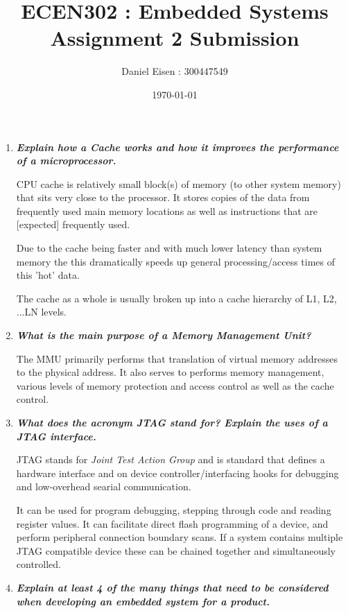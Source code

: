 \documentclass[11pt]{article}
\title{ECEN302 : Embedded Systems \\ Assignment 2 Submission}
\author{Daniel Eisen : 300447549}
\date{\today}
\begin{document}
\maketitle
\begin{enumerate}
    \item \textit{\textbf{Explain how a Cache works and how it improves the performance of a microprocessor.}}
    
    CPU cache is relatively small block(s) of memory (to other system memory) that sits very close to the processor. It stores copies of the data from frequently used main memory locations as well as instructions that are [expected] frequently used.

    Due to the cache being faster and with much lower latency than system memory the this dramatically speeds up general processing/access times of this 'hot' data.

    The cache as a whole is usually broken up into a cache hierarchy of L1, L2, ...LN levels.
    
    \item \textit{\textbf{What is the main purpose of a Memory Management Unit?}}
    
    The MMU primarily performs that translation of virtual memory addresses to the physical address. It also serves to performs memory management, various levels of memory protection and access control as well as the cache control.
    
    \item \textit{\textbf{What does the acronym JTAG stand for? Explain the uses of a JTAG interface.}}
    
    JTAG stands for \textit{Joint Test Action Group} and is standard that defines a hardware interface and on device controller/interfacing hooks for debugging and low-overhead searial communication.

    It can be used for program debugging, stepping through code and reading register values. It can facilitate direct flash programming of a device, and perform peripheral connection boundary scans. If a system contains multiple JTAG compatible device these can be chained together and simultaneously controlled.

    \item \textit{\textbf{Explain at least 4 of the many things that need to be considered when developing an embedded system for a product.}}
    

\end{enumerate}
\end{document}
